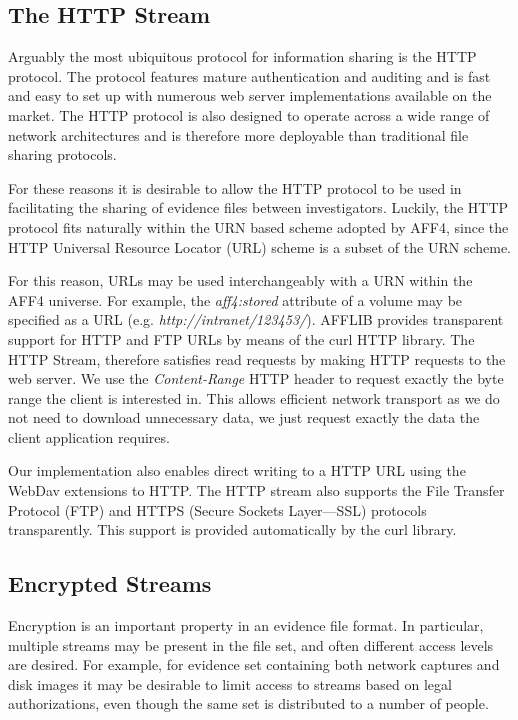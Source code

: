 \documentclass[10pt, conference]{IEEEtran}
\begin{document}
{{\subsection{The HTTP Stream}
Arguably the most ubiquitous protocol for information sharing is the
HTTP protocol\cite{HTTP_RFC}. The protocol features mature
authentication and auditing and is fast and easy to set up with
numerous web server implementations available on the market. The HTTP
protocol is also designed to operate across a wide range of network
architectures and is therefore more deployable than traditional file
sharing protocols.

For these reasons it is desirable to allow the HTTP protocol to be
used in facilitating the sharing of evidence files between
investigators. Luckily, the HTTP protocol fits naturally within the
URN based scheme adopted by AFF4, since the HTTP Universal Resource
Locator (URL) scheme is a subset of the URN scheme.

For this reason, URLs may be used interchangeably with a URN within
the AFF4 universe. For example, the \emph{aff4:stored} attribute of a
volume may be specified as a URL
(e.g. \emph{http://intranet/123453/}).  AFFLIB provides transparent
support for HTTP and FTP URLs by means of the curl HTTP
library\cite{libcurl}. The HTTP Stream, therefore satisfies read
requests by making HTTP requests to the web server. We use the
\emph{Content-Range} HTTP header to request exactly the byte range the
client is interested in. This allows efficient network transport as we
do not need to download unnecessary data, we just request exactly the
data the client application requires.

Our implementation also enables direct writing to a HTTP URL using the
WebDav extensions to HTTP\cite{webdav-rfc}. The HTTP stream also
supports the File Transfer Protocol (FTP) and HTTPS (Secure Sockets
Layer---SSL) protocols transparently. This support is provided
automatically by the curl library.

\subsection{Encrypted Streams}
\label{crypted_stream}
Encryption is an important property in an evidence file format. In
particular, multiple streams may be present in the file set, and often
different access levels are desired. For example, for evidence set
containing both network captures and disk images it may be desirable
to limit access to streams based on legal authorizations, even though
the same set is distributed to a number of people.

}}
\end{document}
